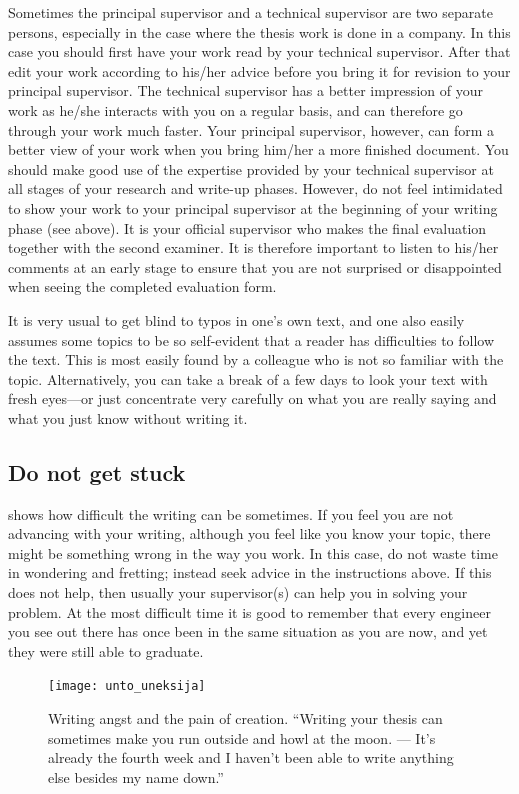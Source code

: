 Sometimes the principal supervisor and a technical supervisor are two
separate persons, especially in the case where the thesis work is
done in a company. In this case you should first have your work read
by your technical supervisor. After that edit your work according to
his/her advice before you bring it for revision to your principal
supervisor. The technical supervisor has a better impression of your
work as he/she interacts with you on a regular basis, and can
therefore go through your work much faster. Your principal
supervisor, however, can form a better view of your work when you
bring him/her a more finished document. You should make good use of
the expertise provided by your technical supervisor at all stages of
your research and write-up phases. However, do not feel intimidated
to show your work to your principal supervisor at the beginning of
your writing phase (see  above). It is your
official supervisor who makes the final evaluation together with the
second examiner. It is therefore important to listen to his/her
comments at an early stage to ensure that you are not surprised or
disappointed when seeing the completed evaluation form.

It is very usual to get blind to typos in one’s own text, and one
also easily assumes some topics to be so self-evident that a reader
has difficulties to follow the text. This is most easily found by a
colleague who is not so familiar with the topic. Alternatively, you
can take a break of a few days to look your text with fresh eyes---or
just concentrate very carefully on what you are really saying and
what you just know without writing it.

\subsection{Do not get stuck}

 shows how difficult the writing can be
sometimes. If you feel you are not advancing with your writing,
although you feel like you know your topic, there might be something
wrong in the way you work. In this case, do not waste time in
wondering and fretting; instead seek advice in the instructions
above. If this does not help, then usually your supervisor(s) can
help you in solving your problem. At the most difficult time it is
good to remember that every engineer you see out there has once been
in the same situation as you are now, and yet they were still able to graduate.

\begin{figure}[ht]
\begin{center}
  \texttt{[image: unto\_uneksija]}
\end{center}
\caption{Writing angst and the pain of creation. “Writing your thesis
  can sometimes
  make you run outside and howl at the moon. --- It’s already the
  fourth week and I
haven’t been able to write anything else besides my name down.”}
\label{fig:unto_uneksija}
\end{figure}

